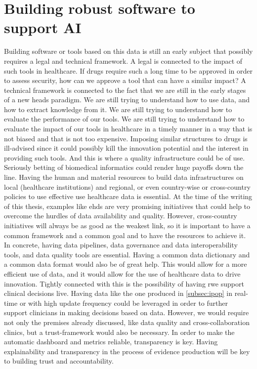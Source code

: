 \section{Building robust software to support AI}
Building software or tools based on this data is still an early subject that possibly requires a legal and technical framework. A legal is connected to the impact of such tools in healthcare. If drugs require such a long time to be approved in order to assess security, how can we approve a tool that can have a similar impact? A technical framework is connected to the fact that we are still in the early stages of a new \ac{heads} paradigm. We are still trying to understand how to use data, and how to extract knowledge from it. We are still trying to understand how to evaluate the performance of our tools.  We are still trying to understand how to evaluate the impact of our tools in healthcare in a timely manner in a way that is not biased and that is not too expensive. Imposing similar structures to drugs is ill-advised since it could possibly kill the innovation potential and the interest in providing such tools. And this is where a quality infrastructure could be of use. Seriously betting of biomedical informatics could render huge payoffs down the line. Having the human and material resources to build data infrastructures on local (healthcare institutions) and regional, or even country-wise or cross-country policies to use effective use healthcare data is essential. At the time of the writing of this thesis, examples like \ac{ehds} are very promising initiatives that could help to overcome the hurdles of data availability and quality. However, cross-country initiatives will always be as good as the weakest link, so it is important to have a common framework and a common goal and to have the resources to achieve it. In concrete, having data pipelines, data governance and data interoperability tools, and data quality tools are essential. Having a common data dictionary and a common data format would also be of great help. This would allow for a more efficient use of data, and it would allow for the use of healthcare data to drive innovation.
Tightly connected with this is the possibility of having \ac{rwe} support clinical decisions live. Having data like the one produced in \ref{subsec:ipop} in real-time or with high update frequency could be leveraged in order to further support clinicians in making decisions based on data. However, we would require not only the premises already discussed, like data quality and cross-collaboration clinics, but a trust-framework would also be necessary. In order to make the automatic dashboard and metrics reliable, transparency is key. Having explainability and transparency in the process of evidence production will be key to building trust and accountability.


